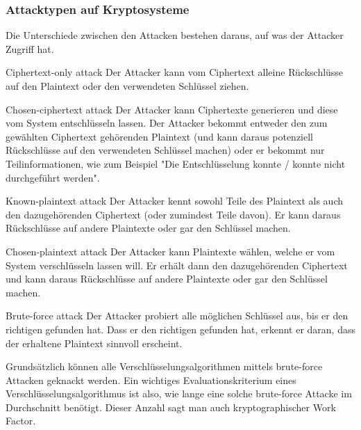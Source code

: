 \subsubsection{Attacktypen auf Kryptosysteme}

\begin{remark}
    Die Unterschiede zwischen den Attacken bestehen daraus, auf was der Attacker Zugriff hat.
\end{remark}

\begin{definition}{Ciphertext-only attack}
    Der Attacker kann vom Ciphertext alleine Rückschlüsse auf den Plaintext oder den 
    verwendeten Schlüssel ziehen.
\end{definition}

\begin{definition}{Chosen-ciphertext attack}
    Der Attacker kann Ciphertexte generieren und diese vom System entschlüsseln lassen. 
    Der Attacker bekommt entweder den zum gewählten Ciphertext gehörenden Plaintext 
    (und kann daraus potenziell Rückschlüsse auf den verwendeten Schlüssel machen) 
    oder er bekommt nur Teilinformationen, wie zum Beispiel 
    "Die Entschlüsselung konnte / konnte nicht durchgeführt werden".
\end{definition}

\begin{definition}{Known-plaintext attack}
    Der Attacker kennt sowohl Teile des Plaintext als auch den dazugehörenden Ciphertext (oder zumindest Teile davon). 
    Er kann daraus Rückschlüsse auf andere Plaintexte oder gar den Schlüssel machen.
\end{definition}

\begin{definition}{Chosen-plaintext attack}
    Der Attacker kann Plaintexte wählen, welche er vom System verschlüsseln lassen will. 
    Er erhält dann den dazugehörenden Ciphertext und kann daraus Rückschlüsse auf 
    andere Plaintexte oder gar den Schlüssel machen.
\end{definition}

\begin{definition}{Brute-force attack}
    Der Attacker probiert alle möglichen Schlüssel aus, bis er den richtigen gefunden hat. 
    Dass er den richtigen gefunden hat, erkennt er daran, dass der erhaltene Plaintext sinnvoll erscheint.
\end{definition}

\begin{remark}
    Grundsätzlich können alle Verschlüsselungsalgorithmen mittels brute-force Attacken geknackt werden. 
    Ein wichtiges Evaluationskriterium eines Verschlüsselungsalgorithmus ist also, wie lange eine solche brute-force Attacke im Durchschnitt benötigt. Dieser Anzahl sagt man auch kryptographischer Work Factor.
\end{remark}

